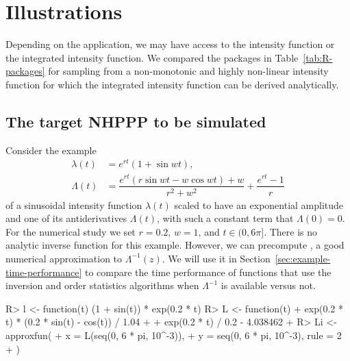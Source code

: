 \documentclass[article,nojss]{jss}\usepackage[]{graphicx}\usepackage[]{xcolor}
\newcommand{\fct}[1]{\code{#1()}}
\begin{document}


\newpage
\section{Illustrations} \label{sec:illustrations}

Depending on the application, we may have access to the intensity function
or the integrated intensity function.
We compared the  packages in Table~\ref{tab:R-packages} for sampling from a non-monotonic and highly non-linear intensity function for which the integrated intensity function can be derived analytically.

\subsection{The target NHPPP to be simulated}\label{sec:illustration-target}

Consider the example
\begin{equation}\label{eq:illustration}
\begin{aligned}
\lambda(t) &= e^{rt}(1+\sin wt), \\
\Lambda(t) &= \dfrac{e^{rt}(r\sin wt - w\cos wt) + w}{r^2+w^2}+\dfrac{e^{rt}-1}{r} %
\end{aligned}
\end{equation}
of a sinusoidal intensity function $\lambda(t)$ scaled to have an exponential amplitude and one of its antiderivatives $\Lambda(t)$, with such a constant term that $\Lambda(0)=0$.  For the numerical study we set $r=0.2$, $w=1$, and $t \in (0, 6\pi]$. There is no  analytic inverse function for this example.
However, we can precompute \fct{Li}, a good numerical approximation to $\Lambda^{-1}(z)$. We will use it in Section~\ref{sec:example-time-performance} to compare the time performance of functions that use the inversion and order statistics algorithms when $\Lambda^{-1}$ is available versus not.
\begin{Schunk}
\begin{Sinput}
R> l <- function(t) (1 + sin(t)) * exp(0.2 * t)
R> L <- function(t) {
+    exp(0.2 * t) * (0.2 * sin(t) - cos(t)) / 1.04 +
+      exp(0.2 * t) / 0.2 - 4.038462
+  }
R> Li <- approxfun(
+    x = L(seq(0, 6 * pi, 10^-3)),
+    y = seq(0, 6 * pi, 10^-3), rule = 2
+  )
\end{Sinput}
\end{Schunk}
\end{document}
